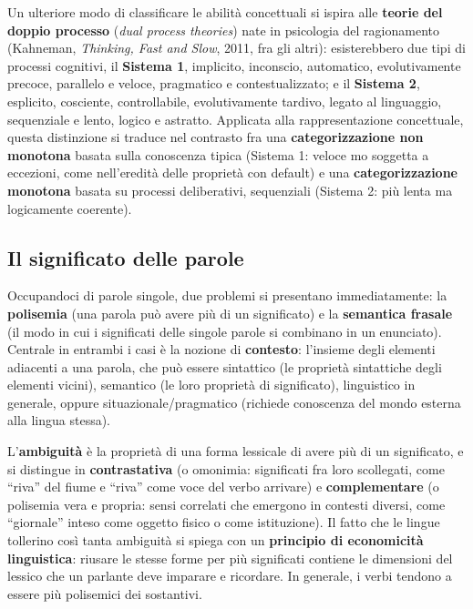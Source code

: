 \documentclass[11pt,a4paper]{report}
\begin{document}
Un ulteriore modo di classificare le abilità concettuali si ispira alle \textbf{teorie del doppio processo} (\emph{dual process theories}) nate in psicologia del ragionamento (Kahneman, \emph{Thinking, Fast and Slow}, 2011, fra gli altri): esisterebbero due tipi di processi cognitivi, il \textbf{Sistema 1}, implicito, inconscio, automatico, evolutivamente precoce, parallelo e veloce, pragmatico e contestualizzato; e il \textbf{Sistema 2}, esplicito, cosciente, controllabile, evolutivamente tardivo, legato al linguaggio, sequenziale e lento, logico e astratto. Applicata alla rappresentazione concettuale, questa distinzione si traduce nel contrasto fra una \textbf{categorizzazione non monotona} basata sulla conoscenza tipica (Sistema 1: veloce mo soggetta a eccezioni, come nell'eredità delle proprietà con default) e una \textbf{categorizzazione monotona} basata su processi deliberativi, sequenziali (Sistema 2: più lenta ma logicamente coerente).

\subsection{Il significato delle parole}

Occupandoci di parole singole, due problemi si presentano immediatamente: la \textbf{polisemia} (una parola può avere più di un significato) e la \textbf{semantica frasale} (il modo in cui i significati delle singole parole si combinano in un enunciato). Centrale in entrambi i casi è la nozione di \textbf{contesto}: l'insieme degli elementi adiacenti a una parola, che può essere sintattico (le proprietà sintattiche degli elementi vicini), semantico (le loro proprietà di significato), linguistico in generale, oppure situazionale/pragmatico (richiede conoscenza del mondo esterna alla lingua stessa).

L'\textbf{ambiguità} è la proprietà di una forma lessicale di avere più di un significato, e si distingue in \textbf{contrastativa} (o omonimia: significati fra loro scollegati, come ``riva'' del fiume e ``riva'' come voce del verbo arrivare) e \textbf{complementare} (o polisemia vera e propria: sensi correlati che emergono in contesti diversi, come ``giornale'' inteso come oggetto fisico o come istituzione). Il fatto che le lingue tollerino così tanta ambiguità si spiega con un \textbf{principio di economicità linguistica}: riusare le stesse forme per più significati contiene le dimensioni del lessico che un parlante deve imparare e ricordare. In generale, i verbi tendono a essere più polisemici dei sostantivi.
\end{document}
